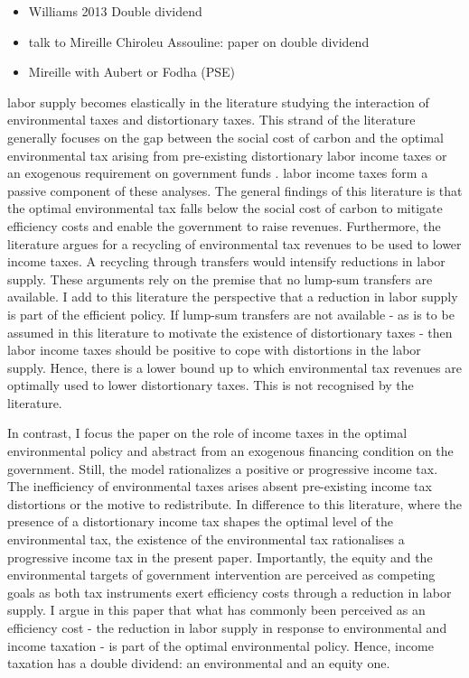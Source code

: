 \begin{itemize}
	\item Williams 2013 Double dividend 
	\item talk to Mireille Chiroleu Assouline: paper on double dividend
	\item Mireille with Aubert or Fodha (PSE)
\end{itemize}
labor supply becomes elastically in the literature studying the interaction of environmental taxes and distortionary taxes.  This strand of the literature generally focuses on the gap between the social cost of carbon and the optimal environmental tax arising from pre-existing distortionary labor income taxes or an exogenous requirement on government funds \citep{Bovenberg1997EnvironmentalGrowth,  Kaplow2012OPTIMALTAXATION, Jacobs2019RedistributionCurves, Barrage2019OptimalPolicy}. labor income taxes form a passive component of these analyses. 
The general findings of this literature is that the optimal environmental tax falls below the social cost of carbon to mitigate efficiency costs and enable the government to raise revenues. 
Furthermore, the literature argues for a recycling of environmental tax revenues to be used to lower income taxes. A recycling through transfers would intensify reductions in labor supply. These arguments rely on the premise that no lump-sum transfers are available. I add to this literature the perspective that a reduction in labor supply is part of the efficient policy. If lump-sum transfers are not available - as is to be assumed in this literature to motivate the existence of distortionary taxes - then labor income taxes should be positive to cope with distortions in the labor supply. Hence, there is a lower bound up to which environmental tax revenues are optimally used to lower distortionary taxes. This is not recognised by the literature. 

In contrast, I focus the paper on the role of income taxes in the optimal environmental policy and abstract from an exogenous financing condition on the government. Still, the model rationalizes a positive or progressive income tax.
 The inefficiency of environmental taxes arises absent pre-existing income tax distortions or the motive to redistribute.
In difference to this literature, where the presence of a distortionary income tax shapes the optimal level of the environmental tax, the existence of the environmental tax rationalises a progressive income tax in the present paper.
Importantly, the equity and the environmental targets of government intervention are perceived as competing goals as both tax instruments exert efficiency costs through a reduction in labor supply. 
I argue in this paper that what has commonly been perceived as an efficiency cost -  the reduction in labor supply in response to environmental and income taxation - is part of the optimal environmental policy. Hence, income taxation has a double dividend: an environmental and an equity one.  

